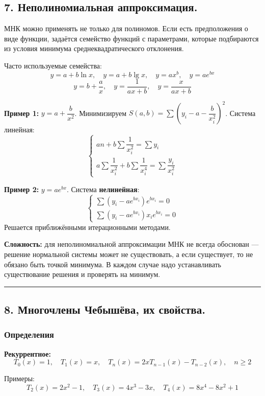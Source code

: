 \documentclass[14pt,a4paper]{extarticle}
\begin{document}
\subsection{7. Неполиномиальная аппроксимация.}

МНК можно применять не только для полиномов. Если есть предположения о виде функции, задаётся семейство функций с параметрами, которые подбираются из условия минимума среднеквадратического отклонения.

Часто используемые семейства:
\[y = a + b \ln x, \quad y = a + b \lg x, \quad y = ax^b, \quad y = ae^{bx}\]
\[y = b + \frac{a}{x}, \quad y = \frac{1}{ax + b}, \quad y = \frac{x}{ax + b}\]

\textbf{Пример 1:} $y = a + \dfrac{b}{x^2}$. Минимизируем $S(a, b) = \sum \left(y_i - a - \dfrac{b}{x_i^2}\right)^2$. Система линейная:
\[\begin{cases} an + b \sum \dfrac{1}{x_i^2} = \sum y_i \\ a \sum \dfrac{1}{x_i^2} + b \sum \dfrac{1}{x_i^4} = \sum \dfrac{y_i}{x_i^2} \end{cases}\]

\textbf{Пример 2:} $y = ae^{bx}$. Система \textbf{нелинейная}:
\[\begin{cases} \sum (y_i - ae^{bx_i}) e^{bx_i} = 0 \\ \sum (y_i - ae^{bx_i}) x_i e^{bx_i} = 0 \end{cases}\]
Решается приближёнными итерационными методами.

\textbf{Сложность:} для неполиномиальной аппроксимации МНК не всегда обоснован --- решение нормальной системы может не существовать, а если существует, то не обязано быть точкой минимума. В каждом случае надо устанавливать существование решения и проверять на минимум.

\hrule\bigskip

\subsection{8. Многочлены Чебышёва, их свойства.}

\subsubsection{Определения}

\textbf{Рекуррентное:}
\[T_0(x) = 1, \quad T_1(x) = x, \quad T_n(x) = 2x T_{n-1}(x) - T_{n-2}(x), \quad n \geq 2\]

Примеры:
\[T_2(x) = 2x^2 - 1, \quad T_3(x) = 4x^3 - 3x, \quad T_4(x) = 8x^4 - 8x^2 + 1\]
\end{document}
